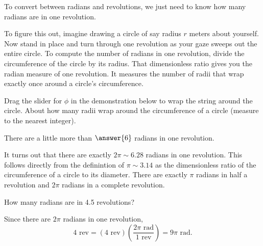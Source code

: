 \documentclass{ximera}
\begin{document}
\begin{exploration}  \label{E33:Angles}
To convert between radians and revolutions, we just need to know how many radians are in one revolution.





To figure this out, imagine drawing a circle of say radius $r$ meters about yourself. Now stand in place and turn through one revolution as your gaze sweeps out the entire circle. To compute the number of radians in one revolution, divide the circumference of the circle by its radius. That dimensionless ratio gives you the radian measure of one revolution. It measures the number of radii that wrap exactly once around a circle's circumference.


\begin{question}
Drag the slider for $\phi$ in the demonstration below to wrap the string around the circle. About how many radii wrap around the circumference of a circle (measure to the nearest integer). 

There are a little more than $\answer{6}$ radians in one revolution.

\end{question}

It turns out that there are exactly $2\pi \sim 6.28$ radians in one revolution. This follows directly from the definintion of $\pi \sim 3.14$ as the dimensionless ratio of the circumference of a circle to its diameter. There are exactly $\pi$ radians in half a revolution and $2\pi$ radians in a complete revolution.


 
\begin{onlineOnly}
    \begin{center}
\end{center}
\end{onlineOnly}
\end{exploration}


\begin{question}  \label{Q43:Angles}
How many radians are in 4.5 revolutions?

\begin{explanation}
Since there are $2\pi$ radians in one revolution,
\[
   4 \text{ rev} = (4 \text{ rev})  \left( \frac{2\pi \text{ rad}}{1 \text{ rev}}  \right)  = 9\pi \text{ rad} .
\]
\end{explanation}
\end{question}
\end{document}

